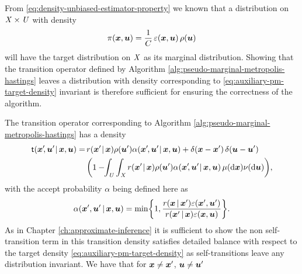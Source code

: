From \eqref{eq:density-unbiased-estimator-property} we known that a distribution on $\mathit{X}\times\mathit{U}$ with density
\begin{equation}\label{eq:auxiliary-pm-target-density}
  \pi(\boldsymbol{x},\boldsymbol{u}) = \frac{1}{C} \,\varepsilon(\boldsymbol{x},\boldsymbol{u})\,\rho(\boldsymbol{u})
\end{equation}
will have the target distribution on $\mathit{X}$ as its marginal distribution. Showing that the transition operator defined by Algorithm \ref{alg:pseudo-marginal-metropolis-hastings} leaves a distribution with density corresponding to \eqref{eq:auxiliary-pm-target-density} invariant is therefore sufficient for ensuring the correctness of the algorithm.

The transition operator corresponding to Algorithm \ref{alg:pseudo-marginal-metropolis-hastings} has a density%
\begin{equation*}
\begin{split}
  \trans(\vct{x}'\kern-2pt,\vct{u}'\kern-1pt\gvn\vct{x},\vct{u}) =\,&
  r(\vct{x}'\kern-1pt\gvn\vct{x}) \rho(\vct{u}') \alpha(\vct{x}'\kern-1pt,\vct{u}'\kern-1pt\gvn\vct{x},\vct{u}) +
  \delta(\vct{x} - \vct{x}')\,\delta(\vct{u} -\vct{u}')\\
  &
  \lpa 
    1 - \kern-3pt
    \int_{\set{U}} \int_{\set{X}} 
      r(\vct{x}'\kern-1pt\gvn\vct{x}) \rho(\vct{u}') \alpha(\vct{x}'\kern-2pt,\vct{u}'\kern-1pt\gvn\vct{x},\vct{u})
    \,\mu(\dr\vct{x})\nu(\dr\vct{u})
  \rpa,
\end{split}
\end{equation*}
with the accept probability $\alpha$ being defined here as
\begin{equation}
  \alpha(\vct{x}',\vct{u}'\gvn\vct{x},\vct{u}) =
  \min\lbr 1, \frac{r(\vct{x}\gvn\vct{x}')\esttgtdens(\vct{x}',\vct{u}')}{r(\vct{x}'\gvn\vct{x})\esttgtdens(\vct{x},\vct{u})}\rbr.
\end{equation}
As in Chapter \ref{ch:approximate-inference} it is sufficient to show the non self-transition term in this transition density satisfies detailed balance with respect to the target density \eqref{eq:auxiliary-pm-target-density} as self-transitions leave any distribution invariant. We have that for $\boldsymbol{x} \neq \boldsymbol{x}'$, $\boldsymbol{u} \neq \boldsymbol{u}'$
